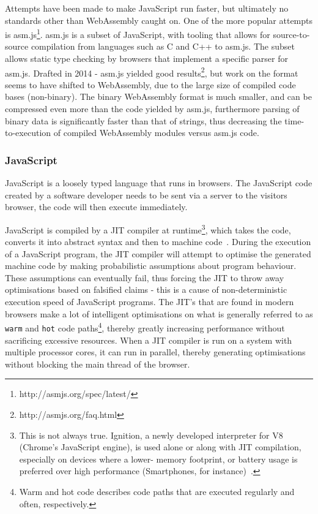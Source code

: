 \documentclass[a4paper]{article}
\begin{document}
Attempts have been made to make JavaScript run faster, but ultimately no standards other than WebAssembly caught on. One of the more popular attempts is asm.js\footnote{http://asmjs.org/spec/latest/}. asm.js is a subset of JavaScript, with tooling that allows for source-to-source compilation from languages such as C and C++ to asm.js. The subset allows static type checking by browsers that implement a specific parser for asm.js. Drafted in 2014 - asm.js yielded good results\footnote{http://asmjs.org/faq.html}, but work on the format seems to have shifted to WebAssembly, due to the large size of compiled code bases (non-binary). The binary WebAssembly format is much smaller, and can be compressed even more than the code yielded by asm.js, furthermore parsing of binary data is significantly faster than that of strings, thus decreasing the time-to-execution of compiled WebAssembly modules versus asm.js code.

\subsubsection{JavaScript}
JavaScript is a loosely typed language that runs in browsers. The JavaScript code created by a software developer needs to be sent via a server to the visitors browser, the code will then execute immediately.

JavaScript is compiled by a JIT compiler at runtime\footnote{This is not always true. Ignition, a newly developed interpreter for V8 (Chrome's JavaScript engine), is used alone or along with JIT compilation, especially on devices where a lower- memory footprint, or battery usage is preferred over high performance (Smartphones, for instance)~\cite{video:thompson-js-perf-v8-and-wasm}.}, which takes the code, converts it into abstract syntax and then to machine code~\cite[p.~13]{slides:lund-v8}. During the execution of a JavaScript program, the JIT compiler will attempt to optimise the generated machine code by making probabilistic assumptions about program behaviour. These assumptions can eventually fail, thus forcing the JIT to throw away optimisations based on falsified claims - this is a cause of non-deterministic execution speed of JavaScript programs. The JIT's that are found in modern browsers make a lot of intelligent optimisations on what is generally referred to as \texttt{warm} and \texttt{hot} code paths\footnote{Warm and hot code describes code paths that are executed regularly and often, respectively.}, thereby greatly increasing performance without sacrificing excessive resources. When a JIT compiler is run on a system with multiple processor cores, it can run in parallel, thereby generating optimisations without blocking the main thread of the browser.
\end{document}
